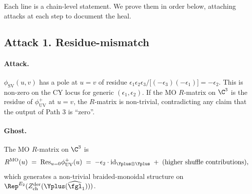 Each line is a chain-level statement. We prove them in order below,
attaching attacks at each step to document the heal.

\subsection*{Attack 1.  Residue-mismatch}

\paragraph{Attack.} $\phi_{\mathrm{SV}}(u, v)$ has a pole at $u = v$
of residue $\epsilon_1 \epsilon_2 \epsilon_3 / \bigl[(-\epsilon_3)
(-\epsilon_1)\bigr] = -\epsilon_2$. This is non-zero on the CY locus
for generic $(\epsilon_1, \epsilon_2)$. If the MO $R$-matrix on $\C^3$
is the residue of $\phi^+_{\mathrm{UV}}$ at $u = v$, the $R$-matrix
is non-trivial, contradicting any claim that the output of Path 3 is
``zero''.

\paragraph{Ghost.} The MO $R$-matrix on $\C^3$ is
\[
 R^{\mathrm{MO}}(u) \;=\; \mathrm{Res}_{u = 0}
 \phi^+_{\mathrm{UV}}(u) \;=\; -\epsilon_2 \cdot \mathrm{id}_{\Yplus
 \otimes \Yplus} \;+\; (\text{higher shuffle contributions}),
\]
which generates a non-trivial braided-monoidal structure on
$\Rep^{E_2}(Z^{\mathrm{der}}_{\mathrm{ch}}(\Yplus(\widehat{\fgl}_1)))$.

